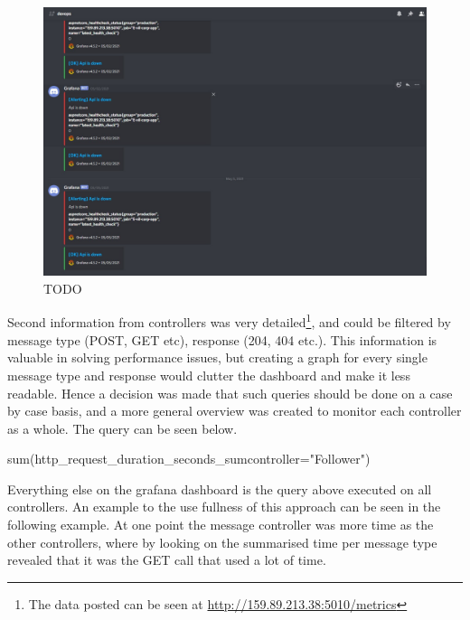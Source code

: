 \documentclass[report/main.tex]{subfiles}
\begin{document}
                \begin{figure}[H]
                    \centering
                    \includegraphics[width=\textwidth]{report/images/Grafana Discord Alert.jpg}
                    \caption{TODO}
                    \label{fig:grafana_discord_alert}
                \end{figure}
                
                Second information from controllers was very detailed\footnote{The data posted can be seen at \hyperlink{http://159.89.213.38:5010/metrics}{http://159.89.213.38:5010/metrics}}, and could be filtered by message type (POST, GET etc), response (204, 404 etc.). This information is valuable in solving performance issues, but creating a graph for every single message type and response would clutter the dashboard and make it less readable. Hence a decision was made that such queries should be done on a case by case basis, and a more general overview was created to monitor each controller as a whole. The query can be seen below.
                
                \begin{center}
                    sum(http\_request\_duration\_seconds\_sum{controller="Follower"})
                \end{center}
                
                Everything else on the grafana dashboard is the query above executed on all controllers. An example to the use fullness of this approach can be seen in the following example. At one point the message controller was more time as the other controllers, where by looking on the summarised time per message type revealed that it was the GET call that used a lot of time.
\end{document}
